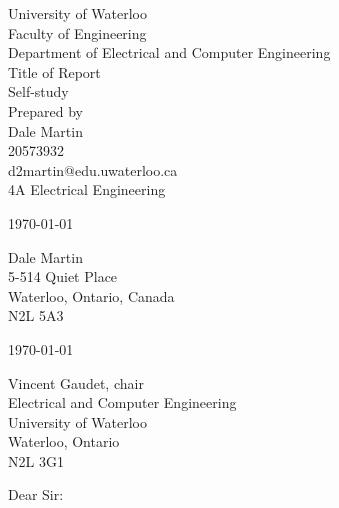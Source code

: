 \documentclass[11pt, a4paper]{article}
\begin{document}

\begin{singlespacing}
    \begin{centering}
        {\LARGE University of Waterloo} \\
        {\large Faculty of Engineering} \\
        {\large Department of Electrical and Computer Engineering} \\
        \vspace{5cm}
        {\Huge Title of Report} \\
        {\Large Self-study} \\
        \vfill
        Prepared by \\
        Dale Martin \\
        20573932 \\
        d2martin@edu.uwaterloo.ca \\
        4A Electrical Engineering \\
        \vspace{0.5cm}
        \begin{otherlanguage}{australian}
            \today \par
        \end{otherlanguage}
        \thispagestyle{empty} %
    \end{centering}
    
    \pagebreak
    \begin{raggedright}
        Dale Martin \\
        5-514 Quiet Place \\
        Waterloo, Ontario, Canada \\
        N2L 5A3
        \medskip
        
        \begin{otherlanguage}{australian}
            \today \par
        \end{otherlanguage}
        \medskip
        
        Vincent Gaudet, chair \\
        Electrical and Computer Engineering \\
        University of Waterloo \\
        Waterloo, Ontario \\
        N2L 3G1
        \medskip
        
        Dear Sir:
        \medskip
        

\end{raggedright}
\end{singlespacing}
\end{document}
